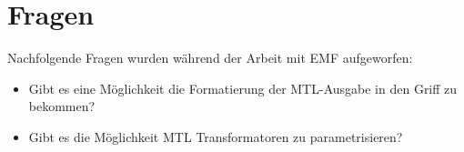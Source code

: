\documentclass[a4paper]{article}
\begin{document}
\section{Fragen}
Nachfolgende Fragen wurden während der Arbeit mit EMF aufgeworfen:
\begin{itemize}
  \item Gibt es eine Möglichkeit die Formatierung der MTL-Ausgabe in den Griff zu bekommen?
  \item Gibt es die Möglichkeit MTL Transformatoren zu parametrisieren?
\end{itemize}
\end{document}
